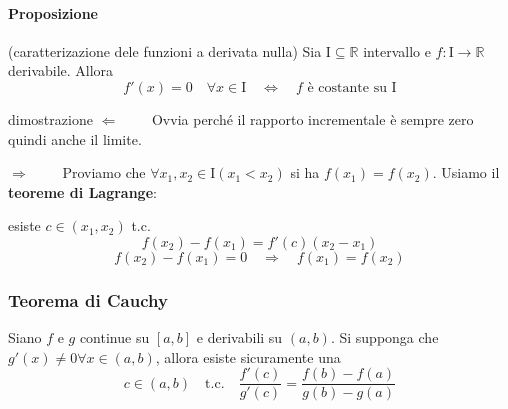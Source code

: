 \documentclass[x11names]{article}
\begin{document}
	\paragraph{Proposizione} (caratterizazione dele funzioni a derivata nulla)
	Sia I$\subseteq \mathbb{R}$ intervallo e $f: \text{I} \to \mathbb{R}$ derivabile. Allora
	\[
	f'(x) = 0 \quad \forall x \in \text{I} \quad \Longleftrightarrow \quad f \text{ è costante su I}
	\]
	\begin{es}{dimostrazione}
		$\Longleftarrow \qquad$ Ovvia perché il rapporto incrementale è sempre zero quindi anche il limite.
		
		$\Longrightarrow \qquad$ Proviamo che $\forall x_1,x_2 \in$I$(x_1 < x_2)$ si  ha $f(x_1) = f(x_2)$.
		Usiamo il \textbf{teoreme di Lagrange}:
		
		esiste $c \in (x_1,x_2)$ t.c.
		\[
		f(x_2) - f(x_1) = f'(c)(x_2 - x_1)
		\]
		\[
		f(x_2) - f(x_1) = 0 \quad \Longrightarrow \quad f(x_1) = f(x_2)
		\]
	\end{es}
	
	\begin{center}
		\colorbox{myred}{\begin{minipage}{5.75in}
				\begin{redes}{}
					\subsubsection{Teorema di Cauchy}
					Siano $f$ e $g$ continue su $[a,b]$ e derivabili su $(a,b)$. Si supponga che $g'(x) \neq 0 \forall x \in (a,b)$, allora esiste sicuramente una
					\[
					c \in (a,b) \quad \text{t.c.} \quad \frac{f'(c)}{g'(c)} = \frac{f(b) - f(a)}{g(b) - g(a)}
					\]
				\end{redes}
		\end{minipage}}        
	\end{center}
	
\end{document}

